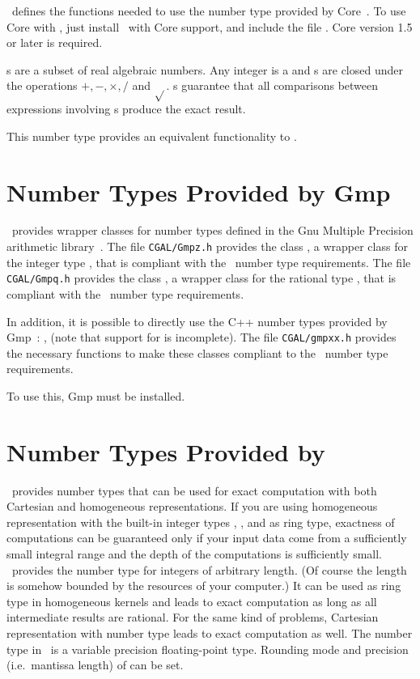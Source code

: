 \cgal\ defines the functions needed to use the number type 
provided by {\sc Core}~\cite{klpy-clp-99}.  To use {\sc Core} with \cgal, just
install \cgal\ with {\sc Core} support, and include the file
.  {\sc Core} version 1.5 or later is required.

s are a subset of real algebraic numbers.  Any integer is a
 and s are closed under the operations
$+,-,\times,/$ and $\sqrt{}$.  s guarantee that all
comparisons between expressions involving s produce the exact
result.

This number type provides an equivalent functionality to .


\section{Number Types Provided by {\sc Gmp}}

\cgal\ provides wrapper classes for number types defined in the
{\sc Gnu} Multiple Precision arithmetic library~\cite{g-ggmpa-}.
The file {\tt  CGAL/Gmpz.h} provides the class ,
a wrapper class for the integer type , that is compliant with the
\cgal\ number type requirements. The file {\tt  CGAL/Gmpq.h} provides the class ,
a wrapper class for the rational type , that is compliant
with the
\cgal\ number type requirements.

In addition, it is possible to directly use the C++ number types provided by
{\sc Gmp}~: ,  (note that support for
 is incomplete).  The file {\tt CGAL/gmpxx.h} provides the
necessary functions to make these classes compliant to the \cgal\ number type
requirements.

To use this, {\sc Gmp} must be installed.


\section{Number Types Provided by \leda}
\label{leda-nt}

\leda\ provides number types that can be used for exact computation 
with both Cartesian and homogeneous representations.  If you are using
homogeneous representation with the built-in integer types
, , and  as ring type, exactness of
computations can be guaranteed only if your input data come from a
sufficiently small integral range and the depth of the computations is
sufficiently small.  \leda\ provides the number type  for
integers of arbitrary length. (Of course the length is
somehow bounded by the resources of your computer.)  It can be used as
ring type in homogeneous kernels and leads to exact
computation as long as all intermediate results are rational.  For the
same kind of problems, Cartesian representation with number type
 leads to exact computation as well.
The number type  in \leda\ is a variable precision
floating-point type. Rounding mode and precision (i.e.\ mantissa length) of
 can be set. 

